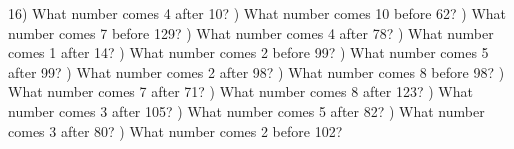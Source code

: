 \documentclass{article}%
\begin{document}
16) What number comes 4 after 10?%
\newline%
\newline%
) What number comes 10 before 62?%
\newline%
\newline%
) What number comes 7 before 129?%
\newline%
\newline%
) What number comes 4 after 78?%
\newline%
\newline%
) What number comes 1 after 14?%
\newline%
\newline%
) What number comes 2 before 99?%
\newline%
\newline%
) What number comes 5 after 99?%
\newline%
\newline%
) What number comes 2 after 98?%
\newline%
\newline%
) What number comes 8 before 98?%
\newline%
\newline%
) What number comes 7 after 71?%
\newline%
\newline%
) What number comes 8 after 123?%
\newline%
\newline%
) What number comes 3 after 105?%
\newline%
\newline%
) What number comes 5 after 82?%
\newline%
\newline%
) What number comes 3 after 80?%
\newline%
\newline%
) What number comes 2 before 102?%
\end{document}
